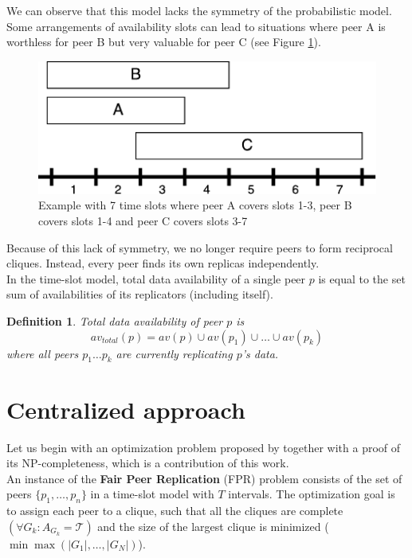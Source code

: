 \documentclass{pracamgren}
\newcounter{collective_ctr} \numberwithin{collective_ctr}{chapter}
\newtheorem{definition}[collective_ctr]{Definition}
\begin{document}
We can observe that this model lacks the symmetry of the probabilistic model. Some arrangements of availability slots can lead to situations where peer A is worthless for peer B but very valuable for peer C (see Figure \ref{fig:abc}).\\

\begin{figure}[h]
\centering
\includegraphics{abc.pdf}
\caption{Example with 7 time slots where peer A covers slots 1-3, peer B covers slots 1-4 and peer C covers slots 3-7}
\label{fig:abc}
\end{figure}

Because of this lack of symmetry, we no longer require peers to form reciprocal cliques. Instead, every peer finds its own replicas independently.\\

In the time-slot model, total data availability of a single peer $p$ is equal to the set sum of availabilities of its replicators (including itself).

\begin{definition}
Total data availability of peer $p$ is
$$av_{total}(p) = av(p) \cup av(p_1) \cup \ldots \cup av(p_k)$$
where all peers $p_1\ldots p_k$ are currently replicating $p$'s data.
\end{definition}
 
\section{Centralized approach}


Let us begin with an optimization problem proposed by \cite{krz} together with a proof of its NP-completeness, which is a contribution of this work.\\

An instance of the {\bf Fair Peer Replication} (FPR) problem consists of the set of peers $\{p_1,\ldots,p_n\}$ in a time-slot model with $T$ intervals. The optimization goal is to assign each peer to a clique, such that all the cliques are complete $(\forall G_k:A_{G_k} = \mathcal{T})$ and the size of the largest clique is minimized ($\min\max(|G_1|,\ldots,|G_N|)$).\\
\end{document}
